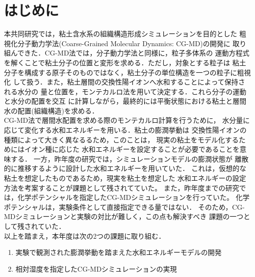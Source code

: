 \section{はじめに}
本共同研究では，粘土含水系の組織構造形成シミュレーションを目的とした
粗視化分子動力学法(Coarse-Grained Molecular Dynamics: CG-MD)の開発に
取り組んできた．CG-MD法では，分子動力学法と同様に，粒子多体系の
運動方程式を解くことで粘土分子の位置と変形を求める．ただし，対象とする粒子は
粘土分子を構成する原子そのものではなく，粘土分子の単位構造を一つの粒子に粗視化
して扱う．また，粘土層間の交換性陽イオンへ水和することによって保持される水分の
量と位置を，モンテカルロ法を用いて決定する．これら分子の運動と水分の配置を交互
に計算しながら，最終的には平衡状態における粘土と層間水の配置(組織構造)を求める．\\
\hspace{\parindent}CG-MD法で層間水配置を求める際のモンテカルロ計算を行うために，
水分量に応じて変化する水和エネルギーを用いる．粘土の膨潤挙動は
交換性陽イオンの種類によって大きく異なるるため，このことは，
現実の粘土をモデル化するためにはイオン種に応じた
水和エネルギーを設定することが必要であることを意味する．
一方，昨年度の研究では，シミュレーションモデルの膨潤状態が
離散的に推移するように設計した水和エネルギーを用いていた．
これは，仮想的な粘土を想定したものであるため，現実を粘土を想定した
水和エネルギーの設定方法を考案することが課題として残されてていた。
また，昨年度までの研究では，化学ポテンシャルを指定したCG-MDシミュレーションを行っていた。
化学ポテンシャルは，実験条件として直接指定できる量ではない．
そのため，CG-MDシミュレーションと実験の対比が難しく，この点も解決すべき
課題の一つとして残されていた．\\
\hspace{\parindent}
以上を踏まえ，本年度は次の2つの課題に取り組む．
\begin{enumerate}
\item
	実験で観測された膨潤挙動を踏まえた水和エネルギーモデルの開発
\item
	相対湿度を指定したCG-MDシミュレーションの実現
\end{enumerate}
